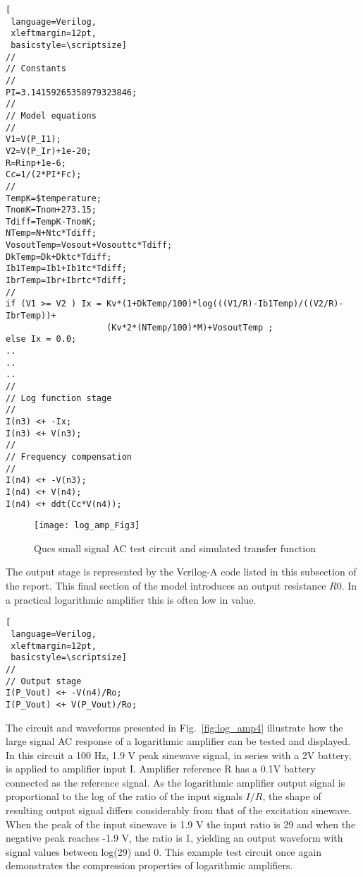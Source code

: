 \begin{lstlisting}[
 language=Verilog, 
 xleftmargin=12pt,
 basicstyle=\scriptsize]
//
// Constants
//
PI=3.14159265358979323846;
//
// Model equations
//
V1=V(P_I1);
V2=V(P_Ir)+1e-20;
R=Rinp+1e-6;
Cc=1/(2*PI*Fc);
//
TempK=$temperature;
TnomK=Tnom+273.15;
Tdiff=TempK-TnomK;
NTemp=N+Ntc*Tdiff;
VosoutTemp=Vosout+Vosouttc*Tdiff;
DkTemp=Dk+Dktc*Tdiff;
Ib1Temp=Ib1+Ib1tc*Tdiff;
IbrTemp=Ibr+Ibrtc*Tdiff;
//
if (V1 >= V2 ) Ix = Kv*(1+DkTemp/100)*log(((V1/R)-Ib1Temp)/((V2/R)-IbrTemp))+
                    (Kv*2*(NTemp/100)*M)+VosoutTemp ;
else Ix = 0.0;
..
..
..
//
// Log function stage
//
I(n3) <+ -Ix;
I(n3) <+ V(n3);
//
// Frequency compensation
//
I(n4) <+ -V(n3);
I(n4) <+ V(n4);
I(n4) <+ ddt(Cc*V(n4));
\end{lstlisting}

\begin{figure}
  \centering
  \texttt{[image: log\_amp\_Fig3]}
  \caption{Qucs small signal AC test circuit and simulated transfer function}
  \label{fig:log_amp3}
\end{figure} 



The output stage is represented by the Verilog-A code listed in this
subsection of the report. This final section of the model introduces
an output resistance $R0$. In a practical logarithmic amplifier this
is often low in value.

\begin{lstlisting}[
 language=Verilog, 
 xleftmargin=12pt,
 basicstyle=\scriptsize]
//
// Output stage
I(P_Vout) <+ -V(n4)/Ro;
I(P_Vout) <+ V(P_Vout)/Ro;
\end{lstlisting}


The circuit and waveforms presented in Fig.~\ref{fig:log_amp4}
illustrate how the large signal AC response of a logarithmic amplifier
can be tested and displayed. In this circuit a 100 Hz, 1.9 V peak
sinewave signal, in series with a 2V battery, is applied to amplifier
input I. Amplifier reference R has a 0.1V battery connected as the
reference signal. As the logarithmic amplifier output signal is
proportional to the log of the ratio of the input signals $I/R$, the
shape of resulting output signal differs considerably from that of the
excitation sinewave. When the peak of the input sinewave is 1.9 V the
input ratio is 29 and when the negative peak reaches -1.9 V, the ratio
is 1, yielding an output waveform with signal values between log(29)
and 0. This example test circuit once again demonstrates the
compression properties of logarithmic amplifiers.

